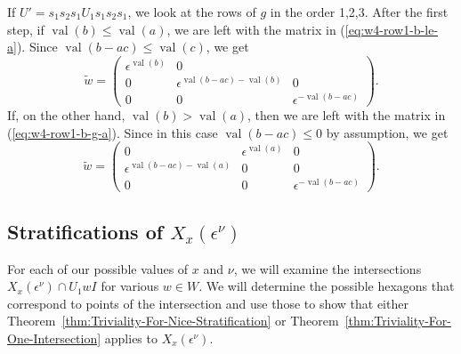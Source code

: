 \documentclass{amsart}
\theoremstyle{definition}
\def\e{\epsilon}
\def\w{\widetilde{w}}
\def\val{\mathop{\mathrm{val}}}
\def\en{\e^{\nu}}
\def\X{X_x(\en)}
\begin{document}
  If $U' = s_1s_2s_1 U_1 s_1s_2s_1$, we look at the rows of $g$ in the order
  1,2,3. After the first step, if $\val(b) \le \val(a)$, we are left with the
  matrix in (\ref{eq:w4-row1-b-le-a}).  Since $\val(b-ac) \le \val(c)$, we get
  \begin{equation*}\w = \begin{pmatrix}
      \e^{\val(b)} & 0 & \\
      0 & \e^{\val(b-ac) - \val(b)} & 0 \\
      0 & 0 & \e^{-\val(b-ac)} 
    \end{pmatrix}.
  \end{equation*}
  If, on the other hand, $\val(b) > \val(a)$, then we are left with the
  matrix in (\ref{eq:w4-row1-b-g-a}).  Since in this case $\val(b-ac) \le
  0$ by assumption, we get
  \begin{equation*}
    \w = \begin{pmatrix}
      0 & \e^{\val(a)} & 0 \\
      \e^{\val(b-ac) - \val(a)}  & 0 & 0\\
      0 & 0 & \e^{-\val(b-ac)} 
    \end{pmatrix}.
  \end{equation*}

  \subsection{Stratifications of $\X$}
  For each of our possible values of $x$ and $\nu$, we will examine the
  intersections $\X \cap U_1 w I$ for various $w \in W$.  We will determine the
  possible hexagons that correspond to points of the intersection and use those
  to show that either Theorem~\ref{thm:Triviality-For-Nice-Stratification} or
  Theorem~\ref{thm:Triviality-For-One-Intersection} applies to $\X$.
\end{document}
